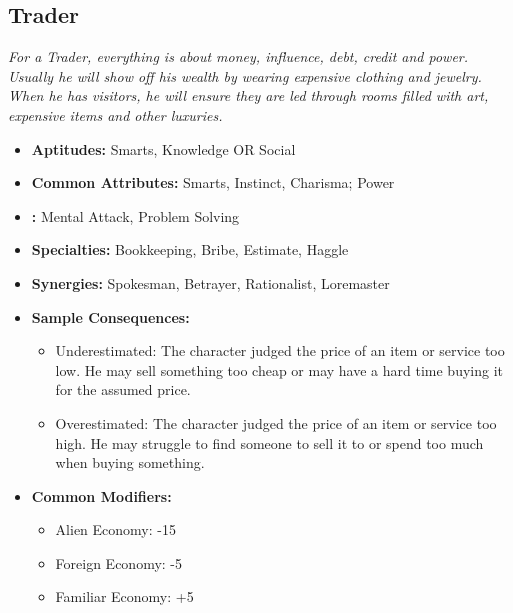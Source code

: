 \subsection{Trader}\label{Trader}
\textit{For a Trader, everything is about money, influence, debt, credit and power.
Usually he will show off his wealth by wearing expensive clothing and jewelry.
When he has visitors, he will ensure they are led through rooms filled with art, expensive items and other luxuries.}
\begin{itemize}
	\item \textbf{Aptitudes:} Smarts, Knowledge OR Social
	\item \textbf{Common Attributes:} Smarts, Instinct, Charisma; Power
	\item \textbf{:} Mental Attack, Problem Solving
	\item \textbf{Specialties:} Bookkeeping, Bribe, Estimate, Haggle
	\item \textbf{Synergies:} Spokesman, Betrayer, Rationalist, Loremaster
	\item \textbf{Sample Consequences:} 
	\begin{itemize}	
		\item Underestimated: The character judged the price of an item or service too low. He may sell something too cheap or may have a hard time buying it for the assumed price.
		\item Overestimated: The character judged the price of an item or service too high. He may struggle to find someone to sell it to or spend too much when buying something.
	\end{itemize}
	\item \textbf{Common Modifiers:}
	\begin{itemize}
		\item Alien Economy: -15
		\item Foreign Economy: -5
		\item Familiar Economy: +5 
	\end{itemize}
\end{itemize}

